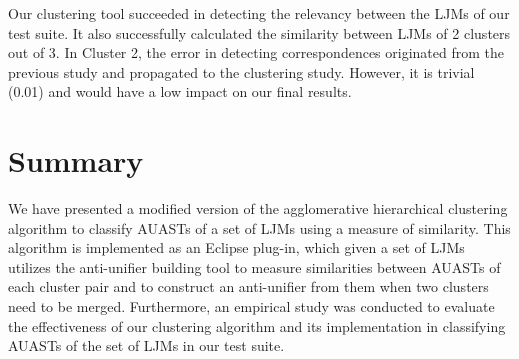 Our clustering tool succeeded in detecting the relevancy between the LJMs of our test suite. It also successfully calculated the similarity between LJMs of 2 clusters out of 3. In Cluster 2, the error in detecting correspondences originated from the previous study and propagated to the clustering study. However, it is trivial (0.01) and would have a low impact on our final results.

\section{Summary} \label{meth2-summary}
We have presented a modified version of the agglomerative hierarchical clustering algorithm to classify AUASTs of a set of LJMs using a measure of similarity. This algorithm is implemented as an Eclipse plug-in, which given a set of LJMs utilizes the anti-unifier building tool to measure similarities between AUASTs of each cluster pair and to construct an anti-unifier from them when two clusters need to be merged. Furthermore, an empirical study was conducted to evaluate the effectiveness of our clustering algorithm and its implementation in classifying AUASTs of the set of LJMs in our test suite.  
